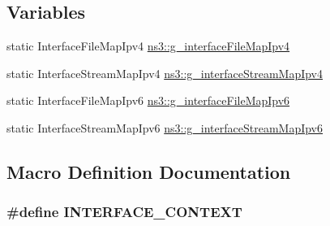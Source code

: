 \subsection*{Variables}
\begin{DoxyCompactItemize}
\item 
static Interface\+File\+Map\+Ipv4 \hyperlink{namespacens3_ac1df4c15ca334fd8713f6600d097c1a6}{ns3\+::g\+\_\+interface\+File\+Map\+Ipv4}
\item 
static Interface\+Stream\+Map\+Ipv4 \hyperlink{namespacens3_ad7720e08dcb21331d85c00128abc175a}{ns3\+::g\+\_\+interface\+Stream\+Map\+Ipv4}
\item 
static Interface\+File\+Map\+Ipv6 \hyperlink{namespacens3_ae5afbbb41177e63c1b4d1c3ac635215d}{ns3\+::g\+\_\+interface\+File\+Map\+Ipv6}
\item 
static Interface\+Stream\+Map\+Ipv6 \hyperlink{namespacens3_a7148863f60ffa7dcfbb51441f0a623fd}{ns3\+::g\+\_\+interface\+Stream\+Map\+Ipv6}
\end{DoxyCompactItemize}


\subsection{Macro Definition Documentation}
\subsubsection[{\texorpdfstring{I\+N\+T\+E\+R\+F\+A\+C\+E\+\_\+\+C\+O\+N\+T\+E\+XT}{INTERFACE_CONTEXT}}]{\setlength{\rightskip}{0pt plus 5cm}\#define I\+N\+T\+E\+R\+F\+A\+C\+E\+\_\+\+C\+O\+N\+T\+E\+XT}\hypertarget{internet-stack-helper_8cc_a7db88cb02fe5c738db27431496b7131e}{}\label{internet-stack-helper_8cc_a7db88cb02fe5c738db27431496b7131e}
